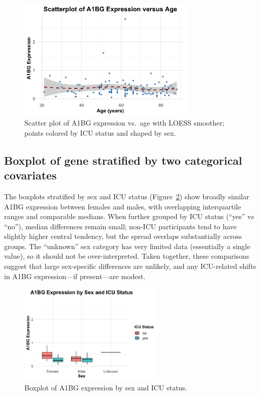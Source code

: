 \documentclass[11pt]{article}
\begin{document}
\begin{figure}[H]
\centering
\includegraphics[width=0.75\textwidth]{fig2_scatter.png}
\caption{Scatter plot of A1BG expression vs.\ age with LOESS smoother; points colored by ICU status and shaped by sex.}
\label{fig:scatter}
\end{figure}

\subsection{Boxplot of gene stratified by two categorical covariates}
The boxplots stratified by sex and ICU status (Figure~\ref{fig:box}) show broadly similar A1BG expression between females and males, with overlapping interquartile ranges and comparable medians. When further grouped by ICU status (“yes” vs “no”), median differences remain small; non-ICU participants tend to have slightly higher central tendency, but the spread overlaps substantially across groups. The “unknown” sex category has very limited data (essentially a single value), so it should not be over-interpreted. Taken together, these comparisons suggest that large sex-specific differences are unlikely, and any ICU-related shifts in A1BG expression—if present—are modest.

\begin{figure}[H]
\centering
\includegraphics[width=0.62\textwidth]{fig3_box.png}
\caption{Boxplot of A1BG expression by sex and ICU status.}
\label{fig:box}
\end{figure}
\end{document}
